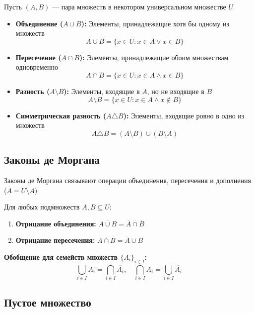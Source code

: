 \documentclass[a4paper,12pt]{article}
\theoremstyle{definition}
\theoremstyle{plain}
\theoremstyle{remark}
\begin{document}
	
	Пусть $(A, B)$ — пара множеств в некотором универсальном множестве $U$
	
	\begin{itemize}
		\item \textbf{Объединение ($A \cup B$):} Элементы, принадлежащие хотя бы одному из множеств
		\[ A \cup B = \{x \in U \colon x \in A \lor x \in B\} \]
		
		\item \textbf{Пересечение ($A \cap B$):} Элементы, принадлежащие обоим множествам одновременно
		\[ A \cap B = \{x \in U \colon x \in A \land x \in B\} \]
		
		\item \textbf{Разность ($A \setminus B$):} Элементы, входящие в $A$, но не входящие в $B$
		\[ A \setminus B = \{x \in U \colon x \in A \land x \notin B\} \]
		
		\item \textbf{Симметрическая разность ($A \triangle B$):} Элементы, входящие ровно в одно из множеств
		\[ A \triangle B = (A \setminus B) \cup (B \setminus A) \]
	\end{itemize}
	
	\subsection{Законы де Моргана}
	
	Законы де Моргана связывают операции объединения, пересечения и дополнения ($\overline{A} = U \setminus A$)
	
	\bigskip
	\begin{tcolorbox}[colback=red!5, colframe=red!70!black, title=Теорема: Законы де Моргана]
		Для любых подмножеств $A, B \subseteq U$:
		\begin{enumerate}
			\item \textbf{Отрицание объединения:} $\overline{A \cup B} = \overline{A} \cap \overline{B}$
			\item \textbf{Отрицание пересечения:} $\overline{A \cap B} = \overline{A} \cup \overline{B}$
		\end{enumerate}
		\medskip
		\textbf{Обобщение для семейств множеств $\{A_i\}_{i \in I}$:}
		\[ \overline{\bigcup_{i \in I} A_i} = \bigcap_{i \in I} \overline{A_i}, \quad \overline{\bigcap_{i \in I} A_i} = \bigcup_{i \in I} \overline{A_i} \]
	\end{tcolorbox}
	
	
	\subsection{Пустое множество}
	
\end{document}
